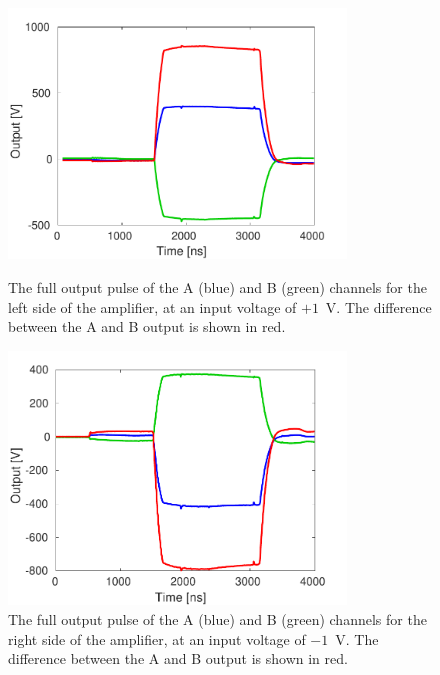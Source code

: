 \begin{figure}
  \centering
  \includegraphics[width=0.8\textwidth]{Figures/commissioning/AmpL_Traces}
  \caption{The full output pulse of the A (blue) and B (green) channels for the left side of the amplifier, at an input voltage of \(+1\)~V. The difference between the A and B output is shown in red.}
  \label{f:ampLTraces}
  \includegraphics[width=0.8\textwidth]{Figures/commissioning/AmpR_Traces}
  \caption{The full output pulse of the A (blue) and B (green) channels for the right side of the amplifier, at an input voltage of \(-1\)~V. The difference between the A and B output is shown in red.}
  \label{f:ampRTraces}
\end{figure}

